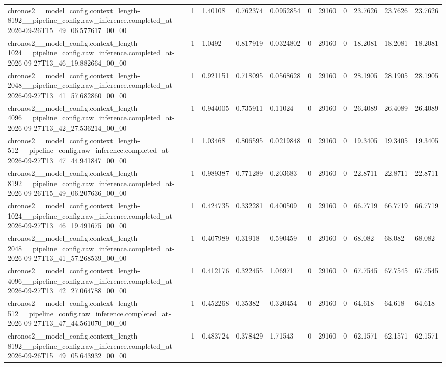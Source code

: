 \begin{tabular}{lllllllllll}
chronos2\_\_model\_config.context\_length-8192\_\_pipeline\_config.raw\_inference.completed\_at-2026-09-26T15\_49\_06.577617\_00\_00 & 1 & 1.40108 & 0.762374 & 0.0952854 & 0 & 29160 & 0 & 23.7626 & 23.7626 & 23.7626 \\
chronos2\_\_model\_config.context\_length-1024\_\_pipeline\_config.raw\_inference.completed\_at-2026-09-27T13\_46\_19.882664\_00\_00 & 1 & 1.0492 & 0.817919 & 0.0324802 & 0 & 29160 & 0 & 18.2081 & 18.2081 & 18.2081 \\
chronos2\_\_model\_config.context\_length-2048\_\_pipeline\_config.raw\_inference.completed\_at-2026-09-27T13\_41\_57.682860\_00\_00 & 1 & 0.921151 & 0.718095 & 0.0568628 & 0 & 29160 & 0 & 28.1905 & 28.1905 & 28.1905 \\
chronos2\_\_model\_config.context\_length-4096\_\_pipeline\_config.raw\_inference.completed\_at-2026-09-27T13\_42\_27.536214\_00\_00 & 1 & 0.944005 & 0.735911 & 0.11024 & 0 & 29160 & 0 & 26.4089 & 26.4089 & 26.4089 \\
chronos2\_\_model\_config.context\_length-512\_\_pipeline\_config.raw\_inference.completed\_at-2026-09-27T13\_47\_44.941847\_00\_00 & 1 & 1.03468 & 0.806595 & 0.0219848 & 0 & 29160 & 0 & 19.3405 & 19.3405 & 19.3405 \\
chronos2\_\_model\_config.context\_length-8192\_\_pipeline\_config.raw\_inference.completed\_at-2026-09-26T15\_49\_06.207636\_00\_00 & 1 & 0.989387 & 0.771289 & 0.203683 & 0 & 29160 & 0 & 22.8711 & 22.8711 & 22.8711 \\
chronos2\_\_model\_config.context\_length-1024\_\_pipeline\_config.raw\_inference.completed\_at-2026-09-27T13\_46\_19.491675\_00\_00 & 1 & 0.424735 & 0.332281 & 0.400509 & 0 & 29160 & 0 & 66.7719 & 66.7719 & 66.7719 \\
chronos2\_\_model\_config.context\_length-2048\_\_pipeline\_config.raw\_inference.completed\_at-2026-09-27T13\_41\_57.268539\_00\_00 & 1 & 0.407989 & 0.31918 & 0.590459 & 0 & 29160 & 0 & 68.082 & 68.082 & 68.082 \\
chronos2\_\_model\_config.context\_length-4096\_\_pipeline\_config.raw\_inference.completed\_at-2026-09-27T13\_42\_27.064788\_00\_00 & 1 & 0.412176 & 0.322455 & 1.06971 & 0 & 29160 & 0 & 67.7545 & 67.7545 & 67.7545 \\
chronos2\_\_model\_config.context\_length-512\_\_pipeline\_config.raw\_inference.completed\_at-2026-09-27T13\_47\_44.561070\_00\_00 & 1 & 0.452268 & 0.35382 & 0.320454 & 0 & 29160 & 0 & 64.618 & 64.618 & 64.618 \\
chronos2\_\_model\_config.context\_length-8192\_\_pipeline\_config.raw\_inference.completed\_at-2026-09-26T15\_49\_05.643932\_00\_00 & 1 & 0.483724 & 0.378429 & 1.71543 & 0 & 29160 & 0 & 62.1571 & 62.1571 & 62.1571 \\

\end{tabular}
